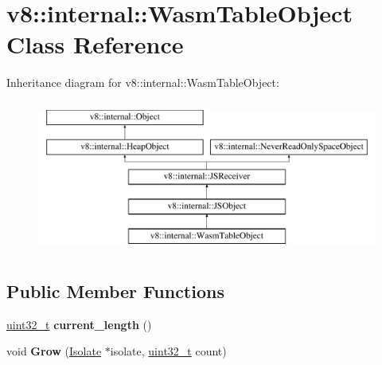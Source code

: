 \hypertarget{classv8_1_1internal_1_1WasmTableObject}{}\section{v8\+:\+:internal\+:\+:Wasm\+Table\+Object Class Reference}
\label{classv8_1_1internal_1_1WasmTableObject}
Inheritance diagram for v8\+:\+:internal\+:\+:Wasm\+Table\+Object\+:\begin{figure}[H]
\begin{center}
\leavevmode
\includegraphics[height=5.000000cm]{classv8_1_1internal_1_1WasmTableObject}
\end{center}
\end{figure}
\subsection*{Public Member Functions}
\begin{DoxyCompactItemize}
\item 
\mbox{\label{classv8_1_1internal_1_1WasmTableObject_a6deac16403ebf5eec01fff7119df6684}} 
\mbox{\hyperlink{classuint32__t}{uint32\+\_\+t}} {\bfseries current\+\_\+length} ()
\item 
\mbox{\label{classv8_1_1internal_1_1WasmTableObject_a5aa40fff30ed423a1960f856be2e156a}} 
void {\bfseries Grow} (\mbox{\hyperlink{classv8_1_1internal_1_1Isolate}{Isolate}} $\ast$isolate, \mbox{\hyperlink{classuint32__t}{uint32\+\_\+t}} count)
\end{DoxyCompactItemize}
